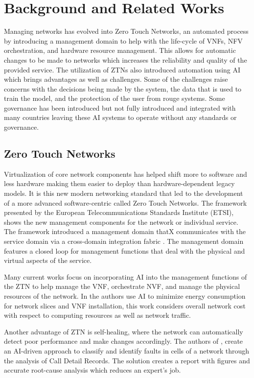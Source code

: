 \section{Background and Related Works}
Managing networks has evolved into Zero Touch Networks, an automated process by introducing a management domain to help with the life-cycle of VNFs, NFV orchestration, and hardware resource management. This allows for automatic changes to be made to networks which increases the reliability and quality of the provided service. The utilization of ZTNs also introduced automation using AI which brings advantages as well as challenges. Some of the challenges raise concerns with the decisions being made by the system, the data that is used to train the model, and the protection of the user from rouge systems. Some governance has been introduced but not fully introduced and integrated with many countries leaving these AI systems to operate without any standards or governance. 



\subsection{Zero Touch Networks}

Virtualization of core network components has helped shift more to software and less hardware making them easier to deploy than hardware-dependent legacy models. It is this new modern networking standard \cite{3gpp_2022} that led to the development of a more advanced software-centric called Zero Touch Networks. The framework presented by the European Telecommunications Standards Institute (ETSI), shows the new management components for the network or individual service. The framework introduced a management domain thatX communicates with the service domain via a cross-domain integration fabric \cite{etsi_2019}. The management domain features a closed loop for management functions that deal with the physical and virtual aspects of the service.

Many current works focus on incorporating AI into the management functions of the ZTN to help manage the VNF, orchestrate NVF, and manage the physical resources of the network. In \cite{ns_energy} the authors use AI to minimize energy consumption for network slices and VNF installation, this work considers overall network cost with respect to computing resources as well as network traffic. 

Another advantage of ZTN is self-healing, where the network can automatically detect poor performance and make changes accordingly. The authors of \cite{CDR_Analysis}, create an AI-driven approach to classify and identify faults in cells of a network through the analysis of Call Detail Records. The solution creates a report with figures and accurate root-cause analysis which reduces an expert's job. 


